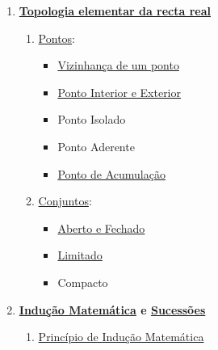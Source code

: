 \documentclass{article}
\begin{document}
\begin{multicols}{2}
\begin{enumerate}[label=\arabic*.]
	
	\item {\bfseries 
		\hyperref[topologia elementar na reta r]
		{Topologia elementar da recta real}
	}
	\begin{enumerate}
	[label=\theenumi\arabic*., left = -5.4mm]
		
		\item \hyperref[pontos]{Pontos}:
		\begin{itemize}[left = -9mm]
		
			\item \hyperref[vizinhanca]
				{Vizinhança de um ponto}
				
			\item \hyperref[interior]
				{Ponto Interior e Exterior}
				
			\item Ponto Isolado
			\item Ponto Aderente
			\item \hyperref[ponto de acumulacao]
				{Ponto de Acumulação}
			
		\end{itemize}
		
		\item \hyperref[conjuntos]{Conjuntos}:
		\begin{itemize}[left = -9mm]
		
			\item \hyperref[conjunto aberto]
				 {Aberto e Fechado}
				 
			\item \hyperref[conjunto limitado]
				 {Limitado}
				 
			\item Compacto
		
		\end{itemize}
		
	\end{enumerate}
	
	\vspace{3mm}
	
	\item {\bfseries 
		\hyperref[inducao matematica]{Indução Matemática}
		e \hyperref[sucessoes]{Sucessões}
	}
	\begin{enumerate}
	[label=\theenumi\arabic*., left = -5.4mm]
	
		\item \hyperref[inducao matematica]
			 {Princípio de Indução Matemática}
		

\end{enumerate}
\end{enumerate}
\end{multicols}
\end{document}
